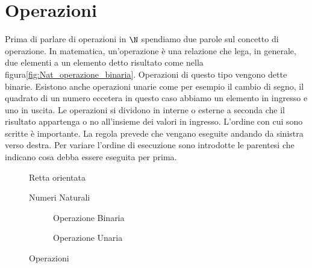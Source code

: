 \section{Operazioni}
Prima di parlare di operazioni in $\N$ spendiamo due parole sul concetto di operazione. In matematica, un'operazione è una relazione che lega, in generale, due elementi a un elemento detto risultato come nella figura\nobs\vref{fig:Nat_operazione_binaria}. Operazioni di questo tipo vengono dette binarie. Esistono anche operazioni unarie come per esempio il cambio di segno, il quadrato di un numero eccetera in questo caso abbiamo un elemento in ingresso e uno in uscita.   Le operazioni si dividono in interne o esterne a seconda che il risultato appartenga o no all'insieme dei valori in ingresso. L'ordine con cui sono scritte è importante. La regola prevede che vengano eseguite andando da sinistra verso destra. Per variare l'ordine di esecuzione sono introdotte le parentesi che indicano cosa debba essere eseguita per prima.
\begin{figure} 
	\centering

	\caption{Retta orientata}
	\label{fig:NumeriNaturaliRetta}\end{figure}
\begin{figure} 
	\centering

	\caption{Numeri Naturali}
	\label{fig:NumeriNaturali}\end{figure}
\begin{figure}
	\begin{subfigure}[b]{.5\linewidth}
		\centering

	\caption{Operazione Binaria}
	\label{fig:Nat_operazione_binaria}
	\end{subfigure}%
	\begin{subfigure}[b]{.5\linewidth}
	\centering

	\caption{Operazione Unaria}
	\label{fig:Nat_operazione_unaria}
	\end{subfigure}
		\caption{Operazioni}
	\label{fig:OPerzionicasogen}
\end{figure}
